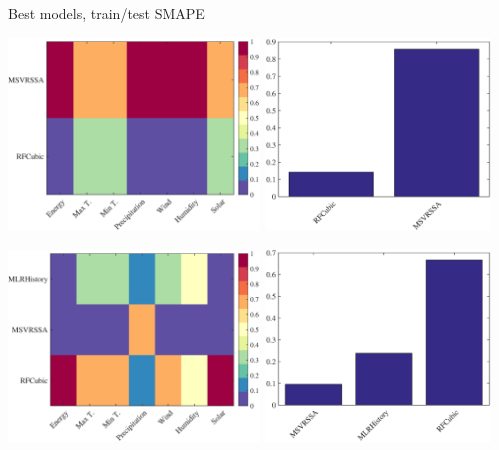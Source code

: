 \documentclass{beamer}
\begin{document}
\begin{frame}{Best models, train/test SMAPE}

\includegraphics[width=0.5\textwidth]{fig/feature_selection/EnergyWeather/best_models_trainSMAPE_colormatrix.eps}
\includegraphics[width=0.45\textwidth]{fig/feature_selection/EnergyWeather/best_models_trainSMAPE_bar.eps}


\includegraphics[width=0.5\textwidth]{fig/feature_selection/EnergyWeather/best_models_testSMAPE_colormatrix.eps}
\includegraphics[width=0.45\textwidth]{fig/feature_selection/EnergyWeather/best_models_testSMAPE_bar.eps}\\

\end{frame}
\end{document}
